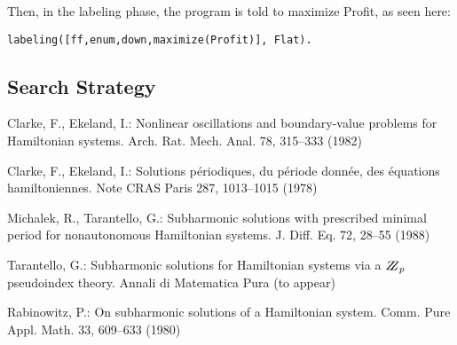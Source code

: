\documentclass{llncs}
\begin{document}
Then, in the labeling phase, the program is told to maximize Profit, as seen here:

\begin{verbatim}
labeling([ff,enum,down,maximize(Profit)], Flat).
\end{verbatim}

\subsection{Search Strategy}

%
%
\begin{thebibliography}{5}
%
Clarke, F., Ekeland, I.:
Nonlinear oscillations and
boundary-value problems for Hamiltonian systems.
Arch. Rat. Mech. Anal. 78, 315--333 (1982)

Clarke, F., Ekeland, I.:
Solutions p\'{e}riodiques, du
p\'{e}riode donn\'{e}e, des \'{e}quations hamiltoniennes.
Note CRAS Paris 287, 1013--1015 (1978)

Michalek, R., Tarantello, G.:
Subharmonic solutions with prescribed minimal
period for nonautonomous Hamiltonian systems.
J. Diff. Eq. 72, 28--55 (1988)

Tarantello, G.:
Subharmonic solutions for Hamiltonian
systems via a $\bbbz_{p}$ pseudoindex theory.
Annali di Matematica Pura (to appear)

Rabinowitz, P.:
On subharmonic solutions of a Hamiltonian system.
Comm. Pure Appl. Math. 33, 609--633 (1980)

\end{thebibliography}
\end{document}
